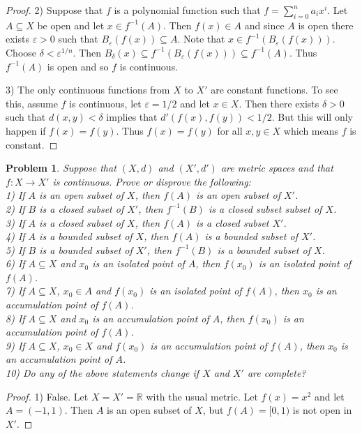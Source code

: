 \documentclass{article}
\newtheorem{problem}{Problem}
\begin{document}
\begin{flushleft}
\begin{proof}
2) Suppose that $f$ is a polynomial function such that $f = \sum_{i=0}^{n} a_i x^i$. Let $A \subseteq X$ be open and let $x \in f^{-1} (A)$. Then $f(x) \in A$ and since $A$ is open there exists $\varepsilon > 0$ such that $B_{\varepsilon}(f(x)) \subseteq A$. Note that $x \in f^{-1}(B_{\varepsilon}(f(x)))$. Choose $\delta < \varepsilon^{1/n}$. Then $B_{\delta}(x) \subseteq f^{-1}(B_{\varepsilon}(f(x))) \subseteq f^{-1}(A)$. Thus $f^{-1}(A)$ is open and so $f$ is continuous.\newline

3) The only continuous functions from $X$ to $X'$ are constant functions. To see this, assume $f$ is continuous, let $\varepsilon = 1/2$ and let $x \in X$. Then there exists $\delta > 0$ such that $d(x,y) < \delta$ implies that $d'(f(x), f(y)) < 1/2$. But this will only happen if $f(x) = f(y)$. Thus $f(x) = f(y)$ for all $x,y \in X$ which means $f$ is constant.
\end{proof}

\begin{problem}
Suppose that $(X,d)$ and $(X',d')$ are metric spaces and that $f : X \rightarrow X'$ is continuous. Prove or disprove the following:\\
1) If $A$ is an open subset of $X$, then $f(A)$ is an open subset of $X'$.\\
2) If $B$ is a closed subset of $X'$, then $f^{-1}(B)$ is a closed subset subset of $X$.\\
3) If $A$ is a closed subset of $X$, then $f(A)$ is a closed subset $X'$.\\
4) If $A$ is a bounded subset of $X$, then $f(A)$ is a bounded subset of $X'$.\\
5) If $B$ is a bounded subset of $X'$, then $f^{-1}(B)$ is a bounded subset of $X$.\\
6) If $A \subseteq X$ and $x_0$ is an isolated point of $A$, then $f(x_0)$ is an isolated point of $f(A)$.\\
7) If $A \subseteq X$, $x_0 \in A$ and $f(x_0)$ is an isolated point of $f(A)$, then $x_0$ is an accumulation point of $f(A)$.\\
8) If $A \subseteq X$ and $x_0$ is an accumulation point of $A$, then $f(x_0)$ is an accumulation point of $f(A)$.\\
9) If $A \subseteq X$, $x_0 \in X$ and $f(x_0)$ is an accumulation point of $f(A)$, then $x_0$ is an accumulation point of $A$.\\
10) Do any of the above statements change if $X$ and $X'$ are complete?
\end{problem}
\begin{proof}
1) False. Let $X = X' = \mathbb{R}$ with the usual metric. Let $f(x) = x^2$ and let $A = (-1,1)$. Then $A$ is an open subset of $X$, but $f(A) = [0,1)$ is not open in $X'$.\newline


\end{proof}
\end{flushleft}
\end{document}
